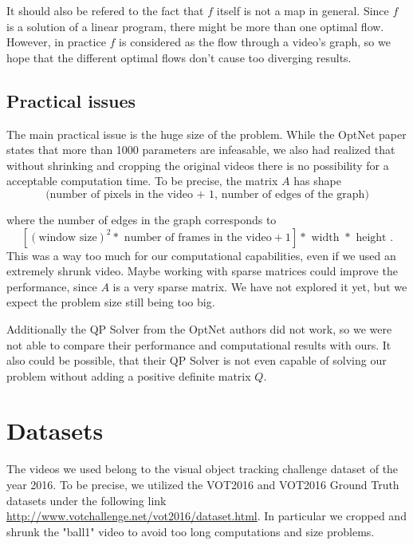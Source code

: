\documentclass{article}
\begin{document}
It should also be refered to the fact that $f$ itself is not a map in general. Since $f$ is a solution of a linear program, there might be more than one optimal flow. However, in practice $f$ is considered as the flow through a video's graph, so we hope that the different optimal flows don't cause too diverging results. 



\subsection{Practical issues}

The main practical issue is the huge size of the problem. While the OptNet paper states that more than 1000 parameters are infeasable, we also had realized that without shrinking and cropping the original videos there is no possibility for a acceptable computation time. To be precise, the matrix $A$ has shape 
\[ \big(\text{number of pixels in the video + 1, number of edges of the graph}\big)\]

where the number of edges in the graph corresponds to \[[(\text{window size})^2  * \text{ number of frames in the video} + 1]* \text{ width } * \text{ height }.\] This was a way too much for our computational capabilities, even if we used an extremely shrunk video. 
Maybe working with sparse matrices could improve the performance, since $A$ is a very sparse matrix. We have not explored it yet, but we expect the problem size still being too big.

Additionally the QP Solver from the OptNet authors did not work, so we were not able to compare their performance and computational results with ours. It also could be possible, that their QP Solver is not even capable of solving our problem without adding a positive definite matrix $Q$.


\section{Datasets}

The videos we used belong to the visual object tracking challenge dataset of the year 2016. To be precise, we utilized the VOT2016 and VOT2016 Ground Truth datasets under the following link \hyperlink{http://www.votchallenge.net/vot2016/dataset.html}{http://www.votchallenge.net/vot2016/dataset.html}. In particular we cropped and shrunk the "ball1" video to avoid too long computations and size problems.
 
\end{document}
